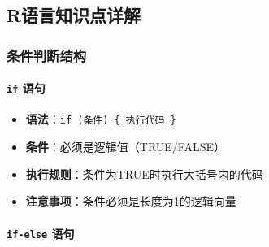\documentclass[
]{book}
\newenvironment{Shaded}{\begin{snugshade}}{\end{snugshade}}
\newcommand{\CommentTok}[1]{\textcolor[rgb]{0.56,0.35,0.01}{\textit{#1}}}
\newcommand{\FunctionTok}[1]{\textcolor[rgb]{0.13,0.29,0.53}{\textbf{#1}}}
\newcommand{\NormalTok}[1]{#1}
\newcommand{\OtherTok}[1]{\textcolor[rgb]{0.56,0.35,0.01}{#1}}
\newcommand{\SpecialCharTok}[1]{\textcolor[rgb]{0.81,0.36,0.00}{\textbf{#1}}}
\newcommand{\StringTok}[1]{\textcolor[rgb]{0.31,0.60,0.02}{#1}}
\providecommand{\tightlist}{%
  \setlength{\itemsep}{0pt}\setlength{\parskip}{0pt}}
\begin{document}
\begin{Shaded}
\end{Shaded}

\hypertarget{rux8bedux8a00ux77e5ux8bc6ux70b9ux8be6ux89e3-7}{%
\subsection{R语言知识点详解}\label{rux8bedux8a00ux77e5ux8bc6ux70b9ux8be6ux89e3-7}}

\hypertarget{ux6761ux4ef6ux5224ux65adux7ed3ux6784}{%
\subsubsection{条件判断结构}\label{ux6761ux4ef6ux5224ux65adux7ed3ux6784}}

\hypertarget{if-ux8bedux53e5}{%
\paragraph{\texorpdfstring{\texttt{if} 语句}{if 语句}}\label{if-ux8bedux53e5}}

\begin{itemize}
\tightlist
\item
  \textbf{语法}：\texttt{if\ (条件)\ \{\ 执行代码\ \}}
\item
  \textbf{条件}：必须是逻辑值（TRUE/FALSE）
\item
  \textbf{执行规则}：条件为TRUE时执行大括号内的代码
\item
  \textbf{注意事项}：条件必须是长度为1的逻辑向量
\end{itemize}

\hypertarget{if-else-ux8bedux53e5}{%
\paragraph{\texorpdfstring{\texttt{if-else} 语句}{if-else 语句}}\label{if-else-ux8bedux53e5}}
\end{document}

